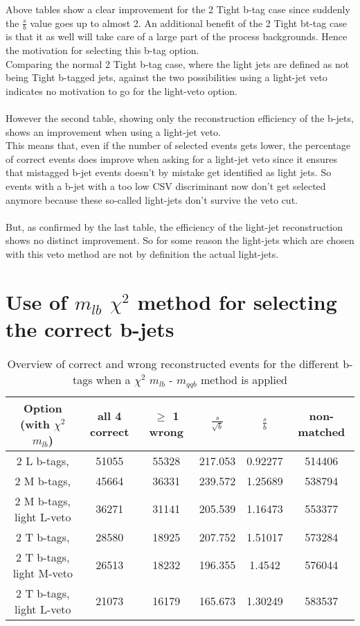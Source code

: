 \documentclass[a4paper,12pt]{report}
\begin{document}
Above tables show a clear improvement for the 2 Tight b-tag case since suddenly the $\frac{s}{b}$ value goes up to almost 2. An additional benefit of the 2 Tight bt-tag case is that it as well will take care of a large part of the process backgrounds. Hence the motivation for selecting this b-tag option.\\
Comparing the normal 2 Tight b-tag case, where the light jets are defined as not being Tight b-tagged jets, against the two possibilities using a light-jet veto indicates no motivation to go for the light-veto option.\\
\\
However the second table, showing only the reconstruction efficiency of the b-jets, shows an improvement when using a light-jet veto.\\
This means that, even if the number of selected events gets lower, the percentage of correct events does improve when asking for a light-jet veto since it ensures that mistagged b-jet events doesn't by mistake get identified as light jets. So events with a b-jet with a too low CSV discriminant now don't get selected anymore because these so-called light-jets don't survive the veto cut.\\
\\
But, as confirmed by the last table, the efficiency of the light-jet reconstruction shows no distinct improvement. So for some reason the light-jets which are chosen with this veto method are not by definition the actual light-jets.

\section{Use of $m_{lb}$ $\chi^{2}$ method for selecting the correct b-jets}
 \begin{table}[!h] 
 \begin{tabular}{c|c|c|c|c|c} 
 \textbf{Option} (with $\chi^{2}$ $m_{lb}$) & all 4 correct      & $\geq$ 1 wrong  & $\frac{s}{\sqrt{b}}$ & $\frac{s}{b}$ & non-matched \\ \hline 
2 L b-tags,                & 51055 & 55328 & 217.053 & 0.92277 & 514406 \\ 
2 M b-tags,              & 45664 & 36331 & 239.572 & 1.25689 & 538794 \\ 
2 M b-tags, light L-veto & 36271 & 31141 & 205.539 & 1.16473 & 553377 \\ 
2 T b-tags,              & 28580 & 18925 & 207.752 & 1.51017 & 573284 \\ 
2 T b-tags, light M-veto & 26513 & 18232 & 196.355 & 1.4542 & 576044 \\ 
2 T b-tags, light L-veto & 21073 & 16179 & 165.673 & 1.30249 & 583537 \\ 
 \end{tabular} 
 \caption{Overview of correct and wrong reconstructed events for the different b-tags when a $\chi^{2}$ $m_{lb}$ - $m_{qqb}$ method is applied} 
 \end{table}
 
\end{document}
